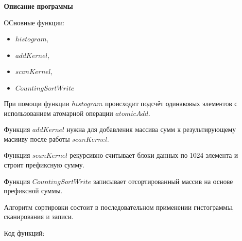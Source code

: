 \textbf{\large Описание программы}

ОСновные функции:
\begin{itemize}
    \setlength\itemsep{0.0em}
    \item $histogram$, 
    \item $addKernel$,
    \item $scanKernel$,
    \item $CountingSortWrite$
\end{itemize}

При помощи функции $histogram$ происходит подсчёт одинаковых элементов с использованием атомарной операции $atomicAdd$.

Функция $addKernel$ нужна для добавления массива сумм к результирующему масииву после работы $scanKernel$.

Функция $scanKernel$ рекурсивно считывает блоки данных по 1024 элемента и строит префиксную сумму.

Функция $CountingSortWrite$ записывает отсортированный массив на основе префиксной суммы.

Алгоритм сортировки состоит в последовательном применении гистограммы, сканирования и записи.

Код функций:

